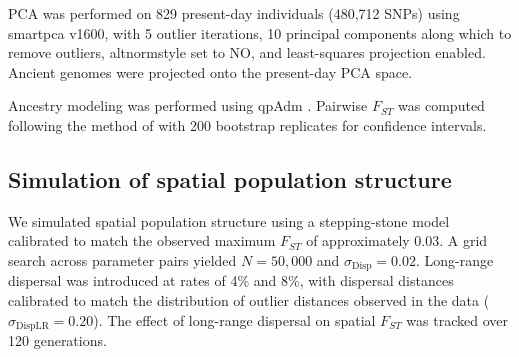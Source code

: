 \documentclass[11pt]{article}
\begin{document}
PCA was performed on 829 present-day individuals (480,712 SNPs) using smartpca v1600, with 5 outlier iterations, 10 principal components along which to remove outliers, altnormstyle set to NO, and least-squares projection enabled. Ancient genomes were projected onto the present-day PCA space.

Ancestry modeling was performed using qpAdm \citep{haak2015, patterson2012}. Pairwise $F_{ST}$ was computed following the method of \citet{bhatia2013} with 200 bootstrap replicates for confidence intervals.

\subsection{Simulation of spatial population structure}

We simulated spatial population structure using a stepping-stone model calibrated to match the observed maximum $F_{ST}$ of approximately 0.03. A grid search across parameter pairs yielded $N = 50{,}000$ and $\sigma_{\text{Disp}} = 0.02$. Long-range dispersal was introduced at rates of 4\% and 8\%, with dispersal distances calibrated to match the distribution of outlier distances observed in the data ($\sigma_{\text{DispLR}} = 0.20$). The effect of long-range dispersal on spatial $F_{ST}$ was tracked over 120 generations.



\end{document}
